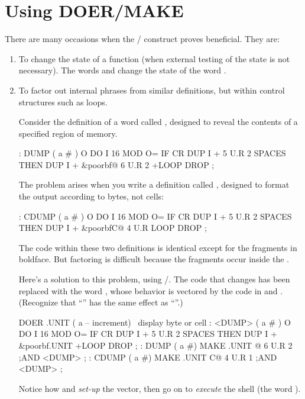 \section{Using DOER/MAKE}

There are many occasions when the / construct proves
beneficial. They are:


\begin{enumerate}
\item To change the state of a function (when external testing of the
state is not necessary). The words  and 
change the state of the word .

\item To factor out internal phrases from similar definitions, but within
control structures such as loops.

Consider the definition of a word called , designed to reveal the
contents of a specified region of memory.

\begin{Code}[commandchars=\&\{\}]
: DUMP  ( a # )
   O DO  I 16 MOD O= IF  CR  DUP I +  5 U.R  2 SPACES  THEN
   DUP I +  &poorbf{@ 6 U.R  2 +LOOP}  DROP ;
\end{Code}
The problem arises when you write a definition called ,
designed to format the output according to bytes, not cells:

\begin{Code}[commandchars=\&\{\}]
: CDUMP  ( a # )
   O DO  I 16 MOD O= IF  CR  DUP I +  5 U.R  2 SPACES  THEN
   DUP I +  &poorbf{C@  4 U.R  LOOP} DROP ;
\end{Code}

The code within these two definitions is identical except for the
fragments in boldface. But factoring is difficult because the fragments
occur inside the .

Here's a solution to this problem, using /. The
code that changes has been replaced with the word , whose
behavior is vectored by the code in  and .
(Recognize that ``'' has the same effect as
``''.)

\begin{Code}[commandchars=\&\{\}]
DOER .UNIT ( a -- increment)  \ display byte or cell
: <DUMP>  ( a # )
   O DO  I 16 MOD O= IF  CR  DUP I +  5 U.R  2 SPACES  THEN
   DUP I + &poorbf{.UNIT}  +LOOP  DROP ;
: DUMP   ( a #)  MAKE .UNIT  @  6 U.R  2 ;AND <DUMP> ;
: CDUMP ( a #)   MAKE .UNIT C@  4 U.R  1 ;AND <DUMP> ;
\end{Code}
Notice how  and  \emph{set-up} the vector,
then go on to \emph{execute} the shell (the word ).


\end{enumerate}
